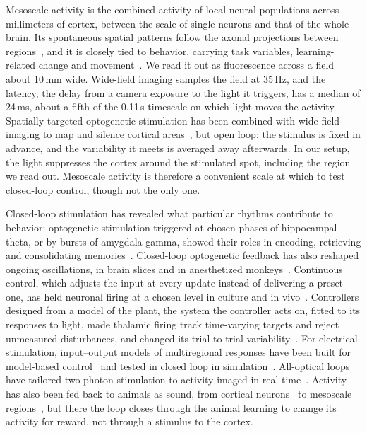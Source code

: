 Mesoscale activity is the combined activity of local neural populations across millimeters of cortex, between the scale of single neurons and that of the whole brain.
Its spontaneous spatial patterns follow the axonal projections between regions~\citep{mohajerani2013spontaneous}, and it is closely tied to behavior, carrying task variables, learning-related change and movement~\citep{allen2017global, makino2017transformation, musall2019single}.
We read it out as fluorescence across a field about 10\,mm wide.
Wide-field imaging samples the field at 35\,Hz, and the latency, the delay from a camera exposure to the light it triggers, has a median of 24\,ms, about a fifth of the 0.11\,s timescale on which light moves the activity.
Spatially targeted optogenetic stimulation has been combined with wide-field imaging to map and silence cortical areas~\citep{Lim2012, ZatkaHaas2021, Matveev2024, Ambrosone2025}, but open loop: the stimulus is fixed in advance, and the variability it meets is averaged away afterwards.
In our setup, the light suppresses the cortex around the stimulated spot, including the region we read out.
Mesoscale activity is therefore a convenient scale at which to test closed-loop control, though not the only one.

Closed-loop stimulation has revealed what particular rhythms contribute to behavior: optogenetic stimulation triggered at chosen phases of hippocampal theta, or by bursts of amygdala gamma, showed their roles in encoding, retrieving and consolidating memories~\citep{Siegle2014, kanta2019closed}.
Closed-loop optogenetic feedback has also reshaped ongoing oscillations, in brain slices and in anesthetized monkeys~\citep{nicholson2018analogue, Zaaimi2022}.
Continuous control, which adjusts the input at every update instead of delivering a preset one, has held neuronal firing at a chosen level in culture and in vivo~\citep{newman2015optogenetic}.
Controllers designed from a model of the plant, the system the controller acts on, fitted to its responses to light, made thalamic firing track time-varying targets and reject unmeasured disturbances, and changed its trial-to-trial variability~\citep{bolus2018design, bolus2021state}.
For electrical stimulation, input--output models of multiregional responses have been built for model-based control~\citep{Yang2018, Yang2021} and tested in closed loop in simulation~\citep{Yang2018}.
All-optical loops have tailored two-photon stimulation to activity imaged in real time~\citep{Zhang2018, Zhang2025}.
Activity has also been fed back to animals as sound, from cortical neurons~\citep{clancy2014volitional, Neely2018} to mesoscale regions~\citep{Gupta2026}, but there the loop closes through the animal learning to change its activity for reward, not through a stimulus to the cortex.

